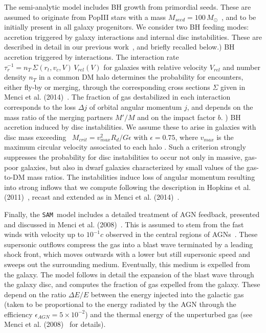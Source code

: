 \documentclass{natureprintstyle}
\newcommand{\sam}{\texttt{SAM}}
\begin{document}
The semi-analytic model includes BH growth from primordial seeds. These are assumed to originate from PopIII stars with a mass $M_{seed}=100\,M_{\odot}$~\cite{Madau2001}, and to be initially present in all galaxy progenitors. We consider two BH feeding modes: accretion triggered by galaxy interactions and internal disc instabilities. These are described in detail in our previous work~\cite{Menci2016}, and briefly recalled below.) BH accretion triggered by interactions. The interaction rate $\tau_r^{-1}=n_T\,\Sigma (r_t,v_c,V)\,V_{rel} (V)$ for galaxies with relative velocity $V_{rel}$ and number density $n_T$ in a common DM halo determines the probability for encounters, 
either fly-by or  merging, through the corresponding cross sections $\Sigma$ given in Menci et al. (2014)~\cite{Menci2014}. The fraction of
gas destabilized in each interaction corresponds to the loss $\Delta j$ of orbital angular momentum $j$, and depends on the mass ratio of the merging partners $M'/M$ and on the impact factor $b$. ) BH accretion induced by disc instabilities. We assume these to arise  in  galaxies with disc mass exceeding~\cite{Efstathiou1982} $M_{crit} =  {v_{max}^2 R_{d}/ G \epsilon}$ with $\epsilon=0.75$, where $v_{max}$ is the maximum circular velocity associated to each halo \cite{Mo1998}. 
Such a criterion strongly suppresses the probability for disc instabilities to occur not only in massive, gas-poor galaxies, but also in 
dwarf galaxies characterized by small values of the gas-to-DM mass ratios.
The instabilities induce loss of angular momentum resulting into strong inflows that we compute following the 
description in Hopkins et al. (2011)~\cite{Hopkins2011}, recast and extended as in Menci et al. (2014)~\cite{Menci2014}. 

Finally, the \sam\ model includes a detailed treatment of AGN feedback, presented and discussed in Menci et al. (2008)~\cite{Menci2008}.
This is assumed to stem from the fast winds with velocity up to
$10^{-1}c$ observed in the central regions of AGNs~\cite{Chartas2002, Pounds2003}.  
These supersonic outflows compress the gas into a blast wave terminated by
a leading shock front, which  moves outwards with a lower but still
supersonic speed and sweeps out the surrounding medium. Eventually,
this medium is expelled from the galaxy. The model follows in detail the expansion of the 
blast wave through the galaxy disc, and computes the fraction of gas expelled from the galaxy.  
These depend on the ratio $\Delta E/E$ between the  energy injected into the galactic gas 
(taken to be proportional to the energy radiated by the 
AGN through the efficiency {\color{red} $\epsilon_{AGN}=5\times 10^{-2}$) }
and the thermal energy of the unperturbed gas (see Menci et al. (2008)~\cite{Menci2008} for details). 
\end{document}
